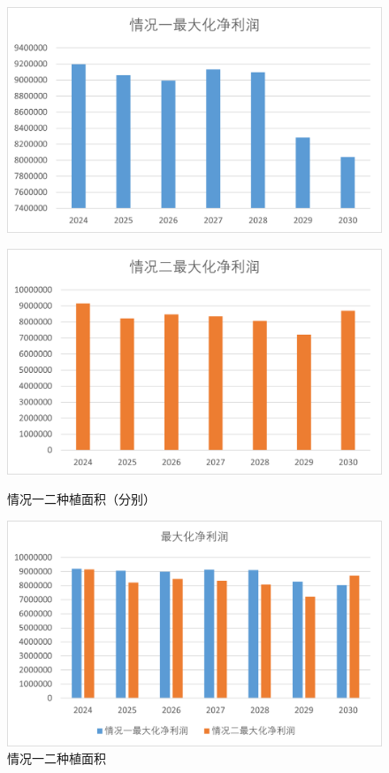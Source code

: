 \documentclass{cumcmthesis}
\begin{document}
\begin{figure}[H]
    \centering
    \begin{minipage}{0.49\textwidth}  %
        \centering
        \includegraphics[width=0.9\linewidth]{1.png}  %
        \label{fig:profit_case1_1}
    \end{minipage}\hfill  %
    \begin{minipage}{0.49\textwidth}  %
        \centering
        \includegraphics[width=0.9\linewidth]{2.png}  %
        \label{fig:profit_case1_2}
    \end{minipage}
    \caption{情况一二种植面积（分别）}
\end{figure}

\begin{figure}[H]
    \centering
    \includegraphics[width=.7\textwidth]{3.png}
    \caption{情况一二种植面积}
    \label{fig:profit_case1_1_2}
\end{figure}
\end{document}
